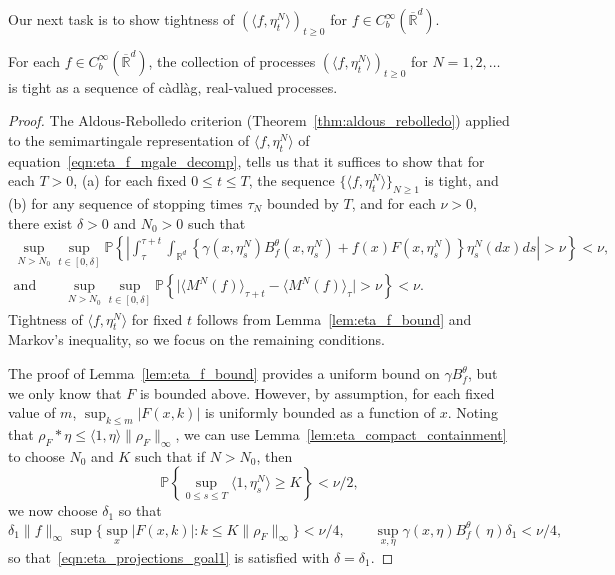 \documentclass[EJP]{ejpecp} %
\newcommand{\IP}{\mathbb P}
\newcommand{\IR}{\mathbb R}
\newcommand{\kernel}{\rho}  %
\newcommand{\smooth}[1]{\kernel_{#1} \! * \!}  %
\begin{document}
Our next task is to show tightness of 
$(\langle f,\eta_t^N\rangle)_{t\geq 0}$ for 
$f\in C_b^\infty(\overline{\IR}^d)$. 

\begin{lemma}
    \label{lem:eta_projections_tightness}
	For each $f \in C^{\infty}_{b}(\overline{\IR}^d)$, 
the collection of processes
$(\langle f, \eta^{N}_t \rangle)_{t \geq 0}$
for $N = 1, 2, \ldots$ is tight
as a sequence of c\`adl\`ag, real-valued processes.
\end{lemma}
\begin{proof}
The Aldous-Rebolledo criterion (Theorem~\ref{thm:aldous_rebolledo})
applied to the semimartingale representation of $\langle f, \eta^N_t\rangle$
of equation~\eqref{eqn:eta_f_mgale_decomp}, tells us
that it suffices to show that for each $T>0$,
(a) for each fixed $0\leq t\leq T$, the sequence $\{\langle f, \eta^N_t \rangle\}_{N \ge 1}$ is tight,
and (b) for any sequence of stopping times $\tau_N$ bounded by $T$,
and for each $\nu > 0$, there exist $\delta > 0$ and $N_0 > 0$ such that 
\begin{gather}
        \label{eqn:eta_projections_goal1}
    \sup_{N > N_0}
    \sup_{t \in [0, \delta]}
    \IP\left\{\left|
            \int_\tau^{\tau + t}
            \int_{\IR^d}
            \left\{
                \gamma(x, \eta^N_s) B^\theta_f(x, \eta^N_s)
                + f(x) F(x, \eta^N_s)
            \right\} 
            \eta^N_s(dx)
            ds
        \right|> \nu \right\}
        < \nu ,
    \\ \text{and} \qquad
        \label{eqn:eta_projections_goal2}
    \sup_{N > N_0}
    \sup_{t \in [0, \delta]}
    \IP\left\{\big|
        \langle M^{N}(f) \rangle_{\tau + t} 
            - \langle M^{N}(f) \rangle_\tau \big|
        > \nu
    \right\}
    < \nu.
\end{gather}
Tightness of $\langle f, \eta^N_t\rangle$ for fixed $t$
follows from Lemma~\ref{lem:eta_f_bound} and Markov's inequality,
so we focus on the remaining conditions.

The proof of Lemma~\ref{lem:eta_f_bound}
provides a uniform bound on $\gamma B^\theta_f$, but we only know
that $F$ is bounded above. However, by assumption, for each fixed value of
$m$, $\sup_{k\leq m}|F(x,k)|$ is uniformly bounded as a function of $x$.
Noting that $\smooth{F}\eta\leq \langle 1,\eta\rangle\|\rho_F\|_\infty$,
we can use Lemma~\ref{lem:eta_compact_containment} 
to choose $N_0$ and $K$ such that
if $N > N_0$, then
$$
    \IP\left\{\sup_{0\leq s\leq T}\langle 1, \eta_s^N\rangle\geq K\right\} < \nu/2,
$$
we now choose $\delta_1$ so that
$$
    \delta_1 \|f\|_\infty \sup\big\{ \sup_{x}|F(x,k)| : k\leq K\|\rho_F\|_\infty \big\}
    <
    \nu/4,
    \qquad
    \sup_{x,\eta}\gamma(x,\eta)B^\theta_f(\,\eta)\delta_1 < \nu/4,
$$
so that~\eqref{eqn:eta_projections_goal1} is satisfied with $\delta = \delta_1$.


\end{proof}
\end{document}
